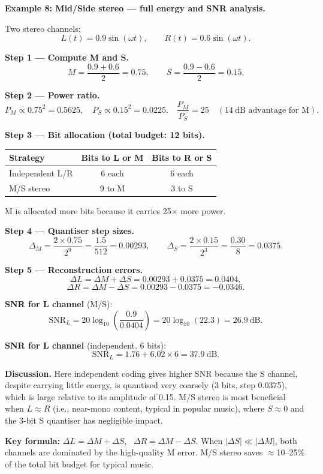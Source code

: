 \begin{examplebox}
\textbf{Example 8: Mid/Side stereo --- full energy and SNR analysis.}

\medskip
\noindent Two stereo channels:
\[
L(t) = 0.9\sin(\omega t), \qquad R(t) = 0.6\sin(\omega t).
\]

\medskip
\noindent\textbf{Step 1 --- Compute M and S.}
\[
M = \frac{0.9+0.6}{2} = 0.75, \qquad S = \frac{0.9-0.6}{2} = 0.15.
\]

\medskip
\noindent\textbf{Step 2 --- Power ratio.}
\[
P_M \propto 0.75^2 = 0.5625, \quad P_S \propto 0.15^2 = 0.0225. \quad
\frac{P_M}{P_S} = 25 \quad (14\ \text{dB advantage for M}).
\]

\medskip
\noindent\textbf{Step 3 --- Bit allocation (total budget: 12 bits).}

\begin{center}
\begin{tabular}{lcc}
\toprule
Strategy & Bits to L or M & Bits to R or S \\
\midrule
Independent L/R & 6 each & 6 each \\
M/S stereo & 9 to M & 3 to S \\
\bottomrule
\end{tabular}
\end{center}

M is allocated more bits because it carries 25$\times$ more power.

\medskip
\noindent\textbf{Step 4 --- Quantiser step sizes.}
\[
\Delta_M = \frac{2\times0.75}{2^9} = \frac{1.5}{512} = 0.00293, \qquad
\Delta_S = \frac{2\times0.15}{2^3} = \frac{0.30}{8} = 0.0375.
\]

\medskip
\noindent\textbf{Step 5 --- Reconstruction errors.}
\[
\Delta L = \Delta M + \Delta S = 0.00293 + 0.0375 = 0.0404,
\]
\[
\Delta R = \Delta M - \Delta S = 0.00293 - 0.0375 = -0.0346.
\]

\textbf{SNR for L channel} (M/S):
\[
\mathrm{SNR}_L = 20\log_{10}\!\left(\frac{0.9}{0.0404}\right) = 20\log_{10}(22.3) = 26.9\ \text{dB}.
\]

\textbf{SNR for L channel} (independent, 6 bits):
\[
\mathrm{SNR}_L = 1.76 + 6.02\times6 = 37.9\ \text{dB}.
\]

\medskip
\noindent\textbf{Discussion.} Here independent coding gives higher SNR because the S channel, despite carrying little energy, is quantised very coarsely (3 bits, step 0.0375), which is large relative to its amplitude of 0.15. M/S stereo is most beneficial when $L \approx R$ (i.e., near-mono content, typical in popular music), where $S \approx 0$ and the 3-bit S quantiser has negligible impact.

\medskip
\noindent\textbf{Key formula:} $\Delta L = \Delta M + \Delta S$, \ $\Delta R = \Delta M - \Delta S$. When $|\Delta S| \ll |\Delta M|$, both channels are dominated by the high-quality M error. M/S stereo saves $\approx$10--25\% of the total bit budget for typical music.
\end{examplebox}


